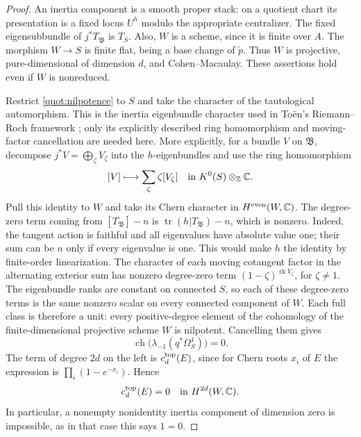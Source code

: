 \begin{proof}
An inertia component is a smooth proper stack: on a quotient chart its
presentation is a fixed locus \(U^h\) modulo the appropriate centralizer.
The fixed eigensubbundle of \(j^*T_{\mathfrak B}\) is \(T_S\).
Also, \(W\) is a scheme, since it is finite over \(A\).
The morphism \(W\to S\) is finite flat, being a base change of
\(\widetilde p\).
Thus \(W\) is projective, pure-dimensional of dimension \(d\), and
Cohen--Macaulay.  These assertions hold even if \(W\) is nonreduced.

Restrict \eqref{quot:nilpotence} to \(S\) and take the character of the
tautological automorphism. This is the inertia eigenbundle character
used in To{\"e}n's Riemann--Roch framework
\cite[Section~3.3 and Lemma~4.6]{Toen1999}; only its explicitly described
ring homomorphism and moving-factor cancellation are needed here.  More explicitly, for a bundle \(V\) on
\(\mathfrak B\), decompose
\(j^*V=\bigoplus_{\zeta} V_\zeta\) into the \(h\)-eigenbundles and use
the ring homomorphism
\[
             [V]\longmapsto\sum_{\zeta}\zeta[V_\zeta]
                \quad\hbox{in }K^0(S)\otimes_{\mathbb Z}\mathbb C .
\]
Pull this identity to \(W\) and take its Chern character in
\(H^{\rm even}(W,\mathbb C)\).
The degree-zero term coming from
\([T_{\mathfrak B}]-n\) is
\(\operatorname{tr}(h|T_{\mathfrak B})-n\), which is nonzero.
Indeed, the tangent action is faithful and all eigenvalues have
absolute value one; their sum can be \(n\) only if every eigenvalue is
one.  This would make \(h\) the identity by finite-order linearization.
The character of each moving cotangent factor in the alternating
exterior sum has nonzero degree-zero term
\((1-\zeta)^{\operatorname{rk}V_\zeta}\), for \(\zeta\ne1\).
The eigenbundle ranks are constant on connected \(S\), so each of
these degree-zero terms is the same nonzero scalar on every connected
component of \(W\).  Each full class is therefore a unit: every
positive-degree element of the cohomology of the finite-dimensional
projective scheme \(W\) is nilpotent.  Cancelling them gives
\[
                 \operatorname{ch}
                   \bigl(\lambda_{-1}(q^*\Omega^1_S)\bigr)=0.
\]
The term of degree \(2d\) on the left is \(c_d^{\rm top}(E)\), since for
Chern roots \(x_i\) of \(E\) the expression is
\(\prod_i(1-e^{-x_i})\).  Hence
\begin{equation}\label{quot:fixed-chern-zero}
                              c_d^{\rm top}(E)=0
                              \quad\hbox{in }H^{2d}(W,\mathbb C).
\end{equation}
In particular, a nonempty nonidentity inertia component of dimension
zero is impossible, as in that case this says \(1=0\).


\end{proof}
